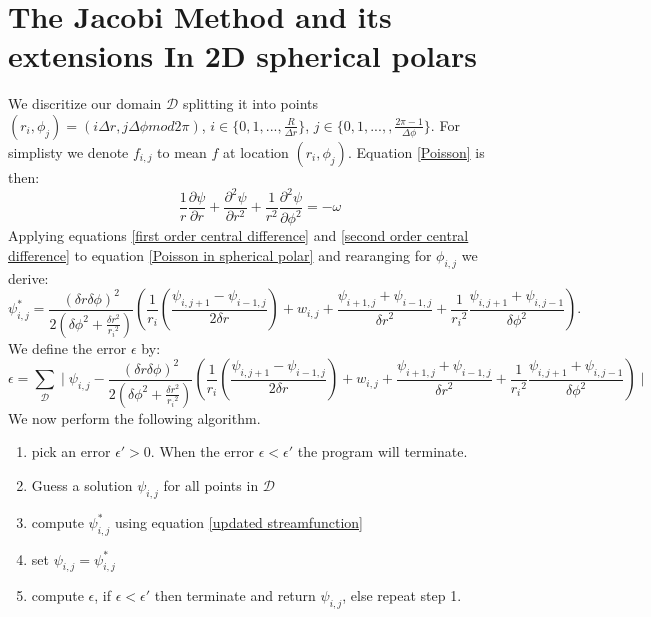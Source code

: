 \documentclass{article}
\begin{document}
\section*{The Jacobi Method and its extensions In 2D spherical polars}
We discritize our domain $\mathcal{D}$ splitting it into points $(r_i, \phi_j) = (i \Delta r, j \Delta \phi mod 2 \pi)$, $i \in \{0, 1, ..., \frac{R}{\Delta r} \}$, $j \in \{ 0,1, ...,, \frac{2 \pi - 1}{\Delta \phi}\}$. For simplisty we denote $f_{i,j}$ to mean $f$ at location $(r_i, \phi_j)$. Equation \ref{Poisson} is then:
\begin{equation}
	\frac{1}{r} \frac{\partial \psi}{\partial r} + \frac{\partial^2 \psi}{\partial r^2} + \frac{1}{r^2} \frac{\partial^2 \psi}{\partial \phi^2} = -\omega
	\label{Poisson in spherical polar}
\end{equation}
Applying equations \ref{first order central difference} and \ref{second order central difference} to equation \ref{Poisson in spherical polar} and rearanging for $\phi_{i,j}$ we derive:
\begin{equation}
	\psi_{i,j}^{*} = \frac{(\delta r \delta \phi)^2}{2 ( {\delta \phi}^2 + \frac{ {\delta r}^2}{{r_i}^2})} ( \frac{1}{r_i} (\frac{\psi_{i,j+1}-\psi_{i-1,j}}{2 \delta r}) +w_{i,j} + \frac{\psi_{i+1,j} + \psi_{i-1,j}}{ {\delta r}^2 } + \frac{1}{ {r_i}^2 } \frac{\psi_{i,j+1} + \psi_{i,j-1}}{ {\delta \phi}^2 }  ).
	\label{updated streamfunction}
\end{equation}
We define the error $\epsilon$ by:
\begin{equation}
	\epsilon = \sum_{\mathcal{D}} \mid  	\psi_{i,j} - \frac{(\delta r \delta \phi)^2}{2 ( {\delta \phi}^2 + \frac{ {\delta r}^2}{{r_i}^2})} ( \frac{1}{r_i} (\frac{\psi_{i,j+1}-\psi_{i-1,j}}{2 \delta r}) +w_{i,j} + \frac{\psi_{i+1,j} + \psi_{i-1,j}}{ {\delta r}^2 } + \frac{1}{ {r_i}^2 } \frac{\psi_{i,j+1} + \psi_{i,j-1}}{ {\delta \phi}^2 }  )  \mid
\end{equation}
We now perform the following algorithm.
\newline
\begin{enumerate}
	\item pick an error $\epsilon' > 0$. When the error $\epsilon < \epsilon'$ the program will terminate.
	\item Guess a solution $\psi_{i,j}$ for all points in $\mathcal{D}$
	\item compute $\psi_{i,j}^{*}$ using equation \ref{updated streamfunction}
	\item set $\psi_{i,j} = \psi_{i,j}^{*}$
	\item compute $\epsilon$, if $\epsilon < \epsilon'$ then terminate and return $\psi_{i,j}$, else repeat step 1.  
\end{enumerate}
\end{document}
